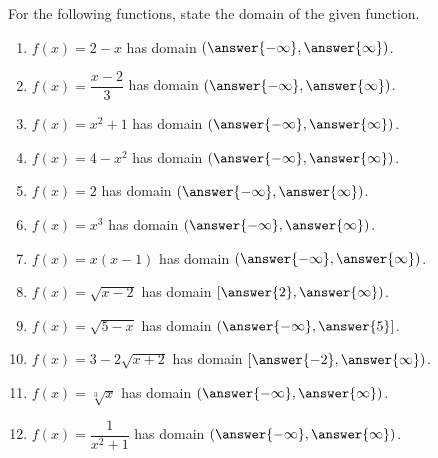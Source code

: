 \documentclass{ximera}
\author{Carl Stitz \and Jeff Zeager \and Bart Snapp \and Matthew Carr}
\begin{document}
\begin{exercise}



For the following functions, state the domain of the given function.
\begin{enumerate}
\item $f(x) = 2-x$ has domain $(\answer{-\infty},\answer{\infty})$.
\item $f(x) = \dfrac{x - 2}{3}$ has domain $(\answer{-\infty},\answer{\infty})$.
\item $f(x) = x^2 + 1$ has domain $(\answer{-\infty},\answer{\infty})$.
\item $f(x) = 4-x^2$ has domain $(\answer{-\infty},\answer{\infty})$.
\item $f(x) = 2$ has domain $(\answer{-\infty},\answer{\infty})$.
\item $f(x) = x^3$ has domain $(\answer{-\infty},\answer{\infty})$.
\item $f(x) = x(x-1)$ has domain $(\answer{-\infty},\answer{\infty})$.
\item $f(x) = \sqrt{x-2}$ has domain $[\answer{2},\answer{\infty})$.
\item $f(x) = \sqrt{5 - x}$ has domain $(\answer{-\infty},\answer{5}]$.
\item $f(x) = 3-2\sqrt{x+2}$ has domain $[\answer{-2},\answer{\infty})$.
\item $f(x) = \sqrt[3]{x}$ has domain $(\answer{-\infty},\answer{\infty})$.
\item $f(x) = \dfrac{1}{x^{2} + 1}$ has domain $(\answer{-\infty},\answer{\infty})$.
\end{enumerate}

\end{exercise}
\end{document}
